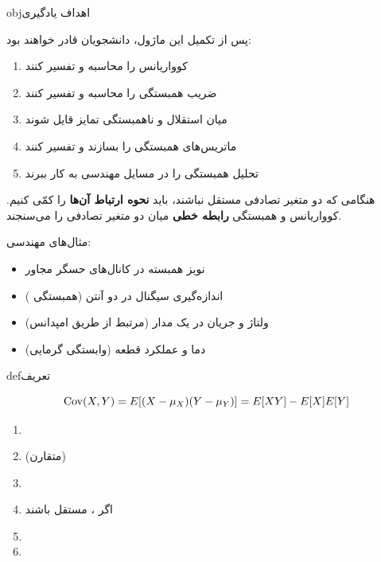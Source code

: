 \begin{PSbox}[unbreakable]{obj}{اهداف یادگیری}

پس از تکمیل این ماژول، دانشجویان قادر خواهند بود:

\begin{enumerate}
\def\labelenumi{\arabic{enumi}.}
\tightlist
\item
  کوواریانس را محاسبه و تفسیر کنند
\item
  ضریب همبستگی را محاسبه و تفسیر کنند
\item
  میان استقلال و ناهمبستگی تمایز قایل شوند
\item
  ماتریس‌های همبستگی را بسازند و تفسیر کنند
\item
  تحلیل همبستگی را در مسایل مهندسی به کار ببرند
\end{enumerate}

\end{PSbox}


هنگامی که دو متغیر تصادفی مستقل نباشند، باید \textbf{نحوه ارتباط آن‌ها} را کمّی کنیم. کوواریانس و همبستگی \textbf{رابطه خطی} میان دو متغیر تصادفی را می‌سنجند.

مثال‌های مهندسی:

\begin{itemize}
\tightlist
\item
  نویز همبسته در کانال‌های حسگر مجاور
\item
  اندازه‌گیری سیگنال در دو آنتن (همبستگی )
\item
  ولتاژ و جریان در یک مدار (مرتبط از طریق امپدانس)
\item
  دما و عملکرد قطعه (وابستگی گرمایی)
\end{itemize}


\begin{PSbox}[unbreakable]{def}{تعریف}

\[\text{Cov}(X,Y) = E[(X - \mu_X)(Y - \mu_Y)] = E[XY] - E[X]E[Y]\]

\end{PSbox}


\begin{enumerate}
\def\labelenumi{\arabic{enumi}.}
\tightlist
\item
\item
   (متقارن)
\item
\item
  اگر ،  مستقل باشند 
\item
\item
\end{enumerate}

